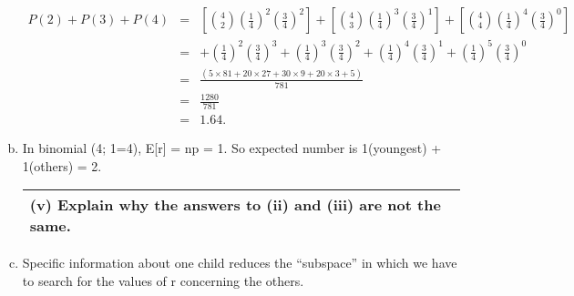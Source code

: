 \documentclass[a4paper,12pt]{article}
\begin{document}
\begin{enumerate}[(a)]
\begin{eqnarray*} 
P(2)+P(3)+P(4) &=& 
\left[ { 4 \choose 2}
\left( \frac{1}{4} \right) ^2 \left(\frac{3}{4}\right)^2 \right]+ 
\left[ { 4 \choose 3}
\left( \frac{1}{4} \right) ^3  \left(\frac{3}{4}\right)^1 \right]
+\left[ { 4 \choose 4}
\left( \frac{1}{4} \right) ^4  \left(\frac{3}{4}\right)^{0} \right]
\\  &=& 
+ \left( \frac{1}{4} \right) ^2  \left(\frac{3}{4}\right)^{3}
+ \left( \frac{1}{4} \right) ^3  \left(\frac{3}{4}\right)^{2}
+ \left( \frac{1}{4} \right) ^4  \left(\frac{3}{4}\right)^{1}
+ \left( \frac{1}{4} \right) ^5  \left(\frac{3}{4}\right)^{0} 
\\ &=&  \frac{(5\times 81+20\times 27+30\times 9+20\times 3+5)}{781}    \\
 &=& \frac{1280}{781} \\
 &=& 1.64.
\end{eqnarray*}

\item In binomial (4; 1=4), E[r] = np = 1.
So expected number is 1(youngest) + 1(others) = 2.
\newpage
  \begin{table}[ht!]
     \centering
     \begin{tabular}{|p{15cm}|}
     \hline     
(v) Explain why the answers to (ii) and (iii) are not the same.\\ \hline
      \end{tabular}
    \end{table}
\item Specific information about one child reduces the “subspace” in which we
have to search for the values of r concerning the others.
\end{enumerate}
\end{document}

